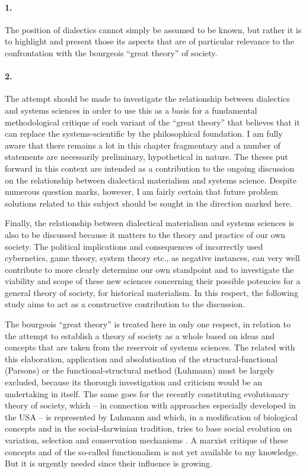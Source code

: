 \documentclass[11pt,a4paper]{article}
\begin{document}
\paragraph{1.}
The position of dialectics cannot simply be assumed to be known, but rather it
is to highlight and present those its aspects that are of particular relevance
to the confrontation with the bourgeois \enquote{great theory} of society.

\paragraph{2.}
The attempt should be made to investigate the relationship between dialectics
and systems sciences in order to use this as a basis for a fundamental
methodological critique of each variant of the \enquote{great theory} that
believes that it can replace the systems-scientific by the philosophical
foundation. I am fully aware that there remains a lot in this chapter
fragmentary and a number of statements are necessarily preliminary,
hypothetical in nature. The theses put forward in this context are intended as
a contribution to the ongoing discussion on the relationship between
dialectical materialism and systems science. Despite numerous question marks,
however, I am fairly certain that future problem solutions related to this
subject should be sought in the direction marked here.

Finally, the relationship between dialectical materialism and systems sciences
is also to be discussed because it matters to the theory and practice of our
own society.  The political implications and consequences of incorrectly used
cybernetics, game theory, system theory etc., as negative instances, can very
well contribute to more clearly determine our own standpoint and to
investigate the viability and scope of these new sciences concerning their
possible potencies for a general theory of society, for historical
materialism. In this respect, the following study aims to act as a
constructive contribution to the discussion.

The bourgeois \enquote{great theory} is treated here in only one respect, in
relation to the attempt to establish a theory of society as a whole based on
ideas and concepts that are taken from the reservoir of systems sciences. The
related with this elaboration, application and absolutisation of the
structural-functional (Parsons) or the functional-structural method (Luhmann)
must be largely excluded, because its thorough investigation and criticism
would be an undertaking in itself. The same goes for the recently constituting
evolutionary theory of society, which -- in connection with approaches
especially developed in the USA -- is represented by Luhmann and which, in a
modification of biological concepts and in the social-darwinian tradition,
tries to base social evolution on variation, selection and conservation
mechanisms \cite{Campbell1969}. A marxist critique of these concepts and of
the so-called functionalism is not yet available to my knowledge. But it is
urgently needed since their influence is growing.
\end{document}
